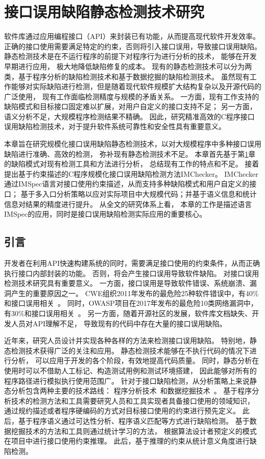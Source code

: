 \chapter{接口误用缺陷静态检测技术研究}
\label{cha:imchecker}
软件库通过应用编程接口（API）来封装已有功能，从而提高现代软件开发效率。
正确的接口使用需要满足特定的约束，否则将引入接口误用，导致接口误用缺陷。
静态检测技术是在不运行程序的前提下对程序行为进行分析的技术，
能够在开发早期进行应用，
极大地降低缺陷修复的成本。
现有的静态检测技术可以分为两类，基于程序分析的缺陷检测技术和基于数据挖掘的缺陷检测技术。
虽然现有工作能够对实际缺陷进行检测，但是随着现代软件规模扩大结构复杂以及开源代码的广泛使用，
现有工作面临检测精度与规模的矛盾关系。
一方面，现有工作支持的缺陷模式和目标接口固定难以扩展，对用户自定义的接口支持不足；
另一方面，语义分析不足，大规模程序检测结果不精确。
因此，研究精准高效的C程序接口误用缺陷检测技术，对于提升软件系统可靠性和安全性具有重要意义。

本章旨在研究规模化接口误用缺陷静态检测技术，以对大规模程序中多种接口误用缺陷进行准确、高效的检测，
弥补现有静态检测技术不足。
本章首先基于第\ref{cha:imchecker}章的缺陷模式对现有检测工具和方法进行分析，
总结现有工作的特点和不足。
接着提出基于约束描述的C程序规模化接口误用缺陷检测方法IMChecker。
IMChecker通过IMSpec语言对接口使用约束描述，从而支持多种缺陷模式和用户自定义的接口；
基于多入口分析策略以应对实际项目中大规模代码；并基于语义信息和统计信息对结果的精度进行提升。
从全文的研究体系上看，
本章的工作是描述语言IMSpec的应用，同时是接口误用缺陷检测实际应用的重要核心。

\section{引言}
开发者在利用API快速构建系统的同时，需要满足接口使用的约束条件，从而正确执行接口内部封装的功能。
否则，将会产生接口误用导致软件缺陷。
对接口误用检测技术研究具有重要意义。
一方面，接口误用是导致软件错误、系统崩溃、漏洞产生的重要原因之一。
CWE组织2011年发布的最危险25种软件错误中，有40\%和接口误用相关~\cite{cwe-top25}。
同时，OWASP项目在2017年发布的最危险10类网络漏洞中，有30\%和接口误用相关~\cite{owasp-top10}。
另一方面，随着开源社区的发展，软件库文档缺失、开发人员对API理解不足，
导致现有的代码中存在大量的接口误用缺陷。

近年来，研究人员设计并实现各种各样的方法来检测接口误用缺陷。
特别地，静态检测技术获得广泛的关注和应用。
静态检测技术能够在不执行代码的情况下进行分析，
可以应用于开发的各个阶段，有效地提高代码质量。
同时，静态分析在使用时可以不借助人工标记、构造测试用例和测试环境搭建，
因此能够对所有的程序路径进行模拟执行使用范围广。
针对于接口缺陷检测，从分析策略上来说静态分析包含两种主要的技术路线：
程序分析技术~\cite{16-saner-evaluation}和数据挖掘技术~\cite{survey18}。
基于程序分析技术的检测方法和工具需要研究人员和工具实现者具备接口使用的领域知识，
通过规约描述或者程序硬编码的方式对目标接口使用的约束进行预先定义。
此后，基于程序语义通过可达性分析、程序语义匹配等方式进行缺陷检测。
基于数据挖掘技术的方法和工具则通过统计学习的方法，
根据算法设计者预定义的模式在项目中进行接口使用约束推理。
此后，基于推理的约束从统计意义角度进行缺陷检测。

